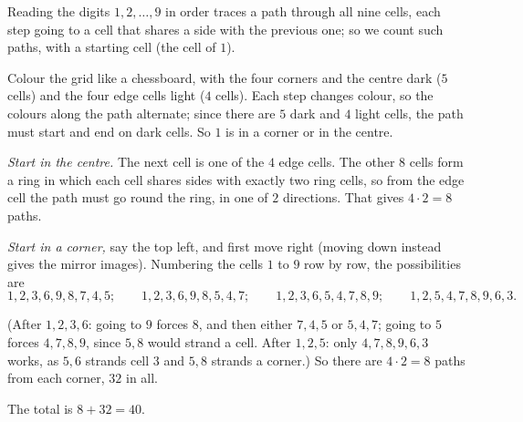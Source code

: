 Reading the digits $1,2,\dots,9$ in order traces a path through all nine cells, each step going to a cell that shares a side with the previous one; so we count such paths, with a starting cell (the cell of $1$).

Colour the grid like a chessboard, with the four corners and the centre dark ($5$ cells) and the four edge cells light ($4$ cells). Each step changes colour, so the colours along the path alternate; since there are $5$ dark and $4$ light cells, the path must start and end on dark cells. So $1$ is in a corner or in the centre.

\emph{Start in the centre.} The next cell is one of the $4$ edge cells. The other $8$ cells form a ring in which each cell shares sides with exactly two ring cells, so from the edge cell the path must go round the ring, in one of $2$ directions. That gives $4\cdot2=8$ paths.

\emph{Start in a corner,} say the top left, and first move right (moving down instead gives the mirror images). Numbering the cells $1$ to $9$ row by row, the possibilities are
\[1,2,3,6,9,8,7,4,5;\qquad 1,2,3,6,9,8,5,4,7;\qquad 1,2,3,6,5,4,7,8,9;\qquad 1,2,5,4,7,8,9,6,3 .\]


(After $1,2,3,6$: going to $9$ forces $8$, and then either $7,4,5$ or $5,4,7$; going to $5$ forces $4,7,8,9$, since $5,8$ would strand a cell. After $1,2,5$: only $4,7,8,9,6,3$ works, as $5,6$ strands cell $3$ and $5,8$ strands a corner.) So there are $4\cdot2=8$ paths from each corner, $32$ in all.

The total is $8+32=\boxed{40}$.
